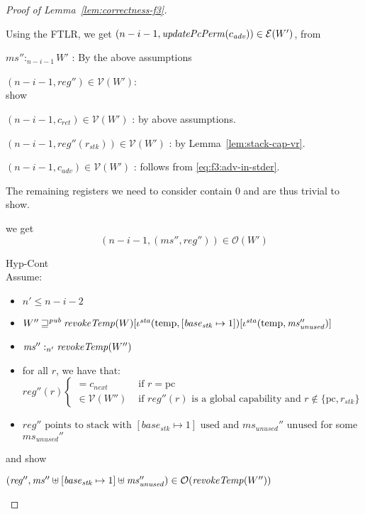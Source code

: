 \documentclass[a4paper]{article}
\newcommand{\var}[1]{\mathit{#1}}
\newcommand{\hs}{\var{ms}}
\newcommand{\ms}{\hs}
\newcommand{\pcreg}{\mathrm{pc}}
\newcommand{\start}{\var{base}}
\newcommand{\reg}{\var{reg}}
\newcommand{\heap}{\var{mem}}
\newcommand{\adv}{\var{adv}}
\newcommand{\stk}{\var{stk}}
\newcommand{\sta}{\var{sta}}
\newcommand{\plainfun}[2]{
  \ifthenelse{\equal{#2}{}}
  {\mathit{#1}}
  {\mathit{#1}(#2)}
}
\newcommand{\updatePcPerm}[1]{\plainfun{updatePcPerm}{#1}}
\newcommand{\revokeTemp}[1]{\plainfun{revokeTemp}{#1}}
\newcommand{\futurewk}{\mathbin{\sqsupseteq}^{\var{pub}}}
\newcommand{\heapSat}[3][\heap]{#1 :_{#2} #3}
\newcommand{\memSat}[3][n]{\heapSat[#2]{#1}{#3}}
\newcommand{\asmType}{\plaindom{AsmType}}
\newcommand{\plaindom}[1]{\mathrm{#1}}
\newcommand{\intr}[2]{\mathcal{#1}}
\newcommand{\valueintr}[1]{\intr{V}{#1}}
\newcommand{\exprintr}[1]{\intr{E}{#1}}
\newcommand{\stdvr}{\valueintr{\asmType}}
\newcommand{\stder}{\exprintr{\asmType}}
\newcommand{\observations}{\mathcal{O}}
\newcommand{\npair}[2][n]{\left(#1,#2 \right)}
\newcommand{\plainview}[1]{\mathrm{#1}}
\newcommand{\temp}{\plainview{temp}}
\begin{document}
\begin{proof}[Proof of Lemma~\ref{lem:correctness-f3}]
\begin{enumproof}
    Using the FTLR, we get $\npair[n-i-1]{\updatePcPerm{c_\adv}} \in \stder(W')$, from
    \begin{enumproof}
      \item $\memSat[n-i-1]{\ms''}{W'}$ : By the above assumptions
      \item $\npair[n-i-1]{\reg''} \in \stdvr(W')$:\\
        show
        \begin{enumproof}
          \item $\npair[n-i-1]{c_{\mathit{ret}}} \in \stdvr(W')$ : by above assumptions.
          \item $\npair[n-i-1]{reg''(r_\stk)} \in \stdvr(W')$ : by Lemma~\ref{lem:stack-cap-vr}.
          \item $\npair[n-i-1]{c_\adv} \in \stdvr(W')$ : follows from \ref{eq:f3:adv-in-stder}.
          \item The remaining registers we need to consider contain 0 and are thus trivial to show.
        \end{enumproof}
    \end{enumproof}
    we get
    \[
      \npair[n-i-1]{(\ms'',\reg'')} \in \observations(W')
    \]
  \item Hyp-Cont\\
    Assume:
    \begin{itemize}
    \item $n' \leq n-i-2$
    \item $W'' \futurewk \revokeTemp{W}[\iota^{\sta}(\temp,[\start_\stk \mapsto 1])[\iota^\sta(\temp,\ms_{\mathit{unused}}'')]$
    \item $\memSat[n']{\ms''}{\revokeTemp{W''}}$ 
    \item for all $r$, we have that:
      \begin{equation*}
        \reg''(r)
        \begin{cases}
          = c_{\mathit{next}} &\text{ if } r = \pcreg\\
          \in \stdvr(W'') &\text{ if $\reg''(r)$ is a global capability and } r \not\in \{\pcreg, r_\stk\}
        \end{cases}
      \end{equation*}
    \item $\reg'' \text{ points to stack with $[\start_\stk \mapsto 1]$ used and $\ms_{\mathit{unused}}''$ unused}$ for some $\ms_{\mathit{unused}}''$
    \end{itemize}
    and show
    \begin{enumproof}
    \item $(\reg'',\ms'' \uplus [\start_\stk \mapsto 1] \uplus \ms_{\var{unused}}'') \in \observations(\revokeTemp{W''})$\\

\end{enumproof}
\end{enumproof}
\end{proof}
\end{document}

